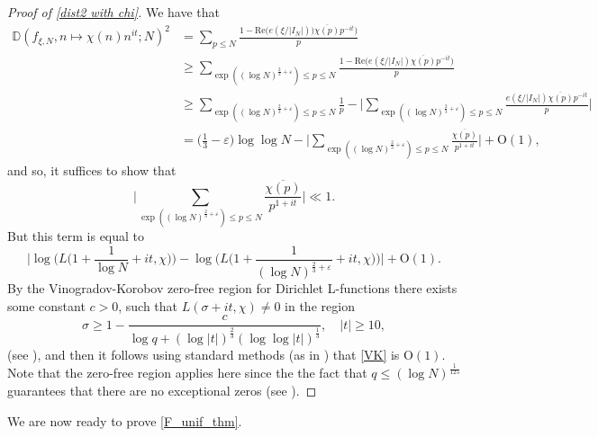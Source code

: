\documentclass[letter,11pt]{article}
\theoremstyle{plain} %
\theoremstyle{definition} %
\theoremstyle{plain}
\theoremstyle{plain}
\theoremstyle{plain}
\numberwithin{equation}{section}
\newcommand{\Oh}{{\mathrm O}}
\renewcommand{\epsilon}{\varepsilon}
\renewcommand{\leq}{\leqslant}
\renewcommand{\geq}{\geqslant}
\renewcommand{\Re}{\mathrm{Re}}
\newcommand{\Dist}{\mathbb{D}}
\newcommand{\1}{\mathbbm{1}}
\newcommand{\f}{f_{\xi,N}}
\begin{document}
\begin{proof}[Proof of \cref{dist2 with chi}]
    We have that
\begin{align*}
    \Dist(\f,n\mapsto \chi(n)n^{it};N)^2 
    &= \sum_{p\leq N}\frac{1-\Re\big(e(\xi/|I_N|)\big)\overline{\chi(p)}p^{-it}\big)}{p} \\
    &\geq \sum_{\exp((\log{N})^{\frac{2}{3}+\epsilon})\leq p\leq N} 
    \frac{1-\Re\big(e(\xi/|I_N|)\overline{\chi(p)}p^{-it}\big)}{p} \\
    &\geq \sum_{\exp((\log{N})^{\frac{2}{3}+\epsilon})\leq p\leq N}
    \frac{1}{p}-\Bigg|\sum_{\exp((\log{N})^{\frac{2}{3}+\epsilon})\leq p\leq N}
    \frac{e(\xi/|I_N|)\overline{\chi(p)}p^{-it}}{p}\Bigg| \\
    &= \bigg(\frac{1}{3}-\epsilon\bigg)\log\log{N}- 
    \Bigg|\sum_{\exp((\log{N})^{\frac{2}{3}+\epsilon})\leq p\leq N}\frac{\overline{\chi(p)}}{p^{1+it}}\bigg|
    +\Oh(1),
\end{align*}
and so, it suffices to show that 
$$\Bigg|\sum_{\exp((\log{N})^{\frac{2}{3}+\epsilon})\leq p\leq N}\frac{\overline{\chi(p)}}{p^{1+it}}\Bigg|
\ll 1.$$ 
But this term is equal to 
\begin{equation}\label{VK}
\Big|\log\Big(L\Big(1+\frac{1}{\log{N}}+it,\chi\Big)\Big)
-\log\Big(L\Big(1+\frac{1}{(\log{N})^{\frac{2}{3}+\epsilon}}+it,\chi\Big)\Big)\Big|+\Oh(1).
\end{equation}
By the Vinogradov-Korobov zero-free region for Dirichlet L-functions there exists some constant $c>0$, such that $L(\sigma+it,\chi)\neq0$ in the region
$$\sigma\geq 1-\frac{c}{\log{q} + (\log|t|)^{\frac{2}{3}}(\log\log|t|)^{\frac{1}{3}}}, \quad |t|\geq 10,$$
(see \cite[p. 176]{Montogomery_ten}), and then
it follows using standard methods
(as in \cite{richert}) that \eqref{VK} is $\Oh(1)$.
Note that the zero-free region applies here since the the fact that $q\leq (\log{N})^\frac{1}{125}$ 
guarantees that there are no exceptional zeros (see \cite[p.6]{MRT15}).
\end{proof}

We are now ready to prove \cref{F_unif_thm}.
\end{document}
